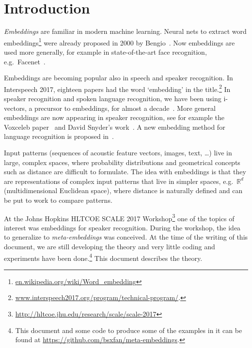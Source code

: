 \documentclass[a4paper,oneside,12pt,english]{report}
\def\R{\mathbb{R}}
\begin{document}
\maketitle



\hypersetup{pageanchor=true}


\tableofcontents
\listoffigures



\chapter{Introduction}

\emph{Embeddings} are familiar in modern machine learning. Neural nets to extract word embeddings\footnote{\url{en.wikipedia.org/wiki/Word_embedding}} were already proposed in 2000 by Bengio~\cite{Bengio_word_embedding}. Now embeddings are used more generally, for example in state-of-the-art face recognition, e.g.\ Facenet~\cite{Facenet}.

Embeddings are becoming popular also in speech and speaker recognition. In Interspeech 2017, eighteen papers had the word `embedding' in the title.\footnote{\url{www.interspeech2017.org/program/technical-program/}.} In speaker recognition and spoken language recognition, we have been using i-vectors, a precursor to embeddings, for almost a decade~\cite{ivector-Brighton,ivec,BUT_ivector_language}. More general embeddings are now appearing in speaker recognition, see for example the Voxceleb paper~\cite{Voxceleb} and David Snyder's work~\cite{end2end,DSIS17}. A new embedding method for language recognition is proposed in~\cite{LIMSI_Language_embedding}. 
 
Input patterns (sequences of acoustic feature vectors, images, text, \ldots) live in large, complex spaces, where probability distributions and geometrical concepts such as distance are difficult to formulate. The idea with embeddings is that they are representations of complex input patterns that live in simpler spaces, e.g.\ $\R^d$ (multidimensional Euclidean space), where distance is naturally defined and can be put to work to compare patterns. 

At the Johns Hopkins HLTCOE SCALE 2017 Workshop\footnote{\url{http://hltcoe.jhu.edu/research/scale/scale-2017}} one of the topics of interest was embeddings for speaker recognition. During the workshop, the idea to generalize to \emph{meta-embeddings} was conceived. At the time of the writing of this document, we are still developing the theory and very little coding and experiments have been done.\footnote{This document and some code to produce some of the examples in it can be found at \url{https://github.com/bsxfan/meta-embeddings}.} This document describes the theory.    
\end{document}
